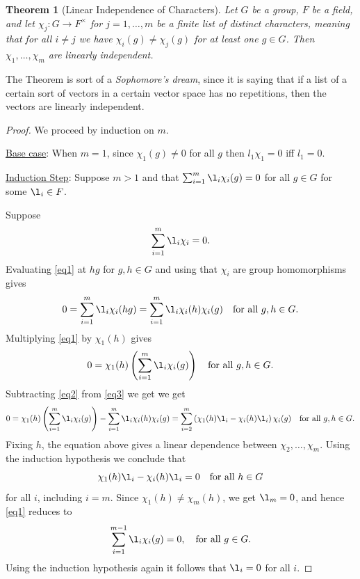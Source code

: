 \documentclass[12pt]{report}
\newtheorem{theorem}{Theorem}[chapter]
\numberwithin{equation}{section}
\numberwithin{theorem}{chapter}
\theoremstyle{definition}
\newtheorem*{basic properties}{Basic Properties}
\newtheorem*{Important Remark}{Important Remark}
\begin{document}
\begin{theorem}[Linear Independence of Characters]\label{linear independence of characters}
Let $G$ be a group, $F$ be a field, and let $\chi_j: G \to F^{\times}$ for $j = 1, \dots, m$ be a finite list of distinct characters, meaning that for all $i \neq j$ we have $\chi_i(g) \neq \chi_j(g)$ for at least one $g \in G$. Then $\chi_1, \dots, \chi_m$ are linearly independent.
\end{theorem}

The Theorem is sort of a \emph{Sophomore's dream}, since it is saying that if a list of a certain sort of vectors in a certain vector space has no repetitions, then the vectors are linearly independent.


\begin{proof} 
We proceed by induction on $m$. 

\underline{Base case}: When $m=1$, since $\chi_1(g) \neq 0$ for all $g$ then $l_1\chi_1=0$ iff $l_1=0$.

\underline{Induction Step}:
Suppose $m > 1$ and that $\sum_{i=1}^m \l_i \chi_i(g) = 0$ for all $g \in G$ for some $\l_i \in F$.  
 
Suppose 
  \begin{equation}
  \label{eq1}
  \sum_{i=1}^m \l_i \chi_i=0.
  \end{equation}
  Evaluating \eqref{eq1} at $hg$ for $g,h\in G$ and using that $\chi_i$ are group homomorphisms gives
  \begin{equation}
  \label{eq2}
0 = \sum_{i=1}^m \l_i \chi_i(hg) = \sum_{i=1}^m \l_i \chi_i(h) \chi_i(g) \quad \textrm{for all } g,h\in G.
\end{equation}
Multiplying  \eqref{eq1}  by $\chi_1(h)$ gives
 \begin{equation}
  \label{eq3}
0 = \chi_1(h)\left(\sum_{i=1}^m \l_i \chi_i(g) \right) \quad \textrm{for all } g,h\in G.
\end{equation}
Subtracting \eqref{eq2} from \eqref{eq3} we get
we get
$$
0 =
 \chi_1(h)\left(\sum_{i=1}^m \l_i \chi_i(g) \right)
-
 \sum_{i=1}^m \l_i \chi_i(h) \chi_i(g)
 = \sum_{i=2}^{m} \left(\chi_1(h) \l_i - \chi_i(h) \l_i \right) \chi_i(g) \quad \textrm{for all } g,h\in G.
$$
Fixing $h$, the equation above gives a linear dependence between $\chi_2,\ldots, \chi_m$. Using the induction hypothesis we conclude that
$$\chi_{1}(h) \l_i - \chi_i(h) \l_i = 0 \quad \textrm{for all } h\in G$$
for all $i$, including $i = m$. Since $\chi_{1}(h) \ne \chi_m(h)$,
we get $\l_m = 0$, and hence \eqref{eq1} reduces to 
$$\sum_{i=1}^{m-1} \l_i \chi_i(g) = 0, \quad \textrm{for all } g\in G.$$
Using the induction hypothesis again it follows that $\l_i = 0$ for all $i$.
\end{proof}
\end{document}
